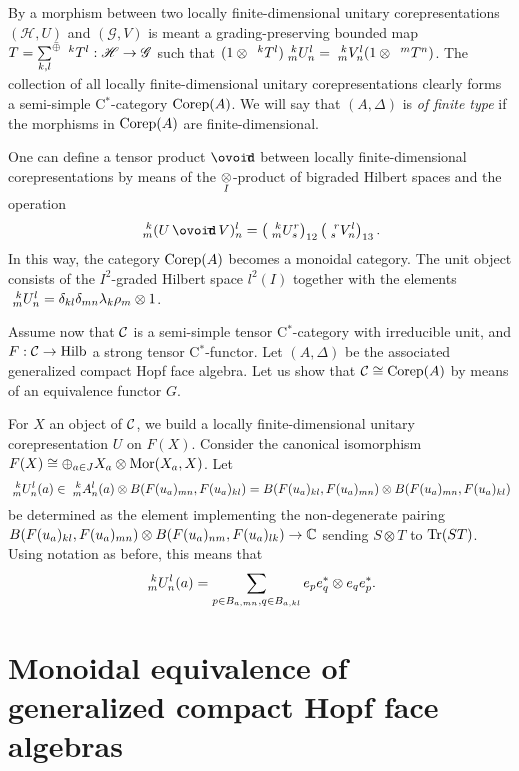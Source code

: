 By a morphism between two locally finite-dimensional unitary corepresentations $(\mathscr{H},U)$ and $(\mathscr{G},V)$ is meant a grading-preserving bounded map $T = \osumc{k,l} \Gru{T}{k}{l}:\mathscr{H}\rightarrow \mathscr{G}$ such that $(1\otimes \Gru{T}{k}{l})\Gr{U}{k}{l}{m}{n} = \Gr{V}{k}{l}{m}{n}(1\otimes \Gru{T}{m}{n})$. The collection of all locally finite-dimensional unitary corepresentations clearly forms a semi-simple C$^*$-category $\CoRep(A)$. We will say that $(A,\Delta)$ is \emph{of finite type} if the morphisms in $\CoRep(A)$ are finite-dimensional.

One can define a tensor product $\Circt$ between locally finite-dimensional corepresentations by means of the $\iitimes$-product of bigraded Hilbert spaces and the operation
\[\Gr{(U\Circt V)}{k}{l}{m}{n} = \left(\Gr{U}{k}{r}{m}{s}\right)_{12}\left(\Gr{V}{r}{l}{s}{n}\right)_{13}.\] In this way, the category $\CoRep(A)$ becomes a monoidal category. The unit object consists of the $I^2$-graded Hilbert space $l^2(I)$ together with the elements $\Gr{U}{k}{l}{m}{n}= \delta_{kl}\delta_{mn}\lambda_k\rho_m\otimes 1$.

Assume now that $\CatC$ is a semi-simple tensor C$^*$-category with irreducible unit, and $F:\CatC\rightarrow \Hilb$ a strong tensor C$^*$-functor. Let $(A,\Delta)$ be the associated generalized compact Hopf face algebra. Let us show that $\CatC\cong \CoRep(A)$ by means of an equivalence functor $G$.

For $X$ an object of $\CatC$, we build a locally finite-dimensional unitary corepresentation $U$ on $F(X)$. Consider the canonical isomorphism $F(X) \cong \oplus_{a\in J} X_a \otimes \Mor(X_a,X)$. Let \[\Gr{U}{k}{l}{m}{n}(a) \in  \Gr{A}{k}{l}{m}{n}(a)\otimes B(F(u_a)_{mn},F(u_a)_{kl})= B(F(u_a)_{kl},F(u_a)_{mn})\otimes B(F(u_a)_{mn},F(u_a)_{kl})\] be determined as the element implementing the non-degenerate pairing $B(F(u_a)_{kl},F(u_a)_{mn})\otimes B(F(u_a)_{nm},F(u_a)_{lk})\rightarrow \C$ sending $S\otimes T$ to $\Tr(ST)$. Using notation as before, this means that \[\Gr{U}{k}{l}{m}{n}(a) = \sum_{p\in B_{a,mn},q\in B_{a,kl}} e_pe_q^*\otimes e_qe_p^*.\]



\section*{Monoidal equivalence of generalized compact Hopf face algebras}

